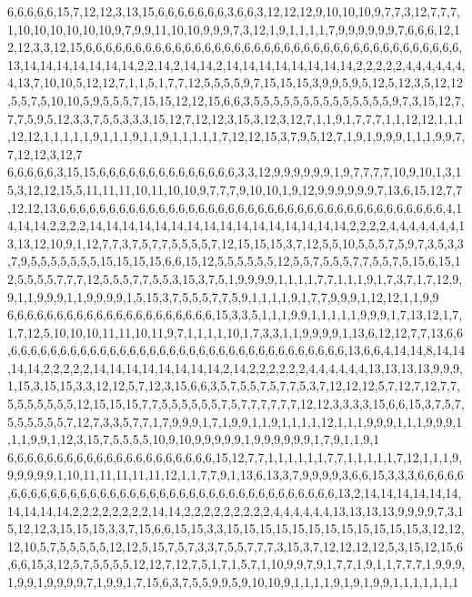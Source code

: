 6,6,6,6,6,15,7,12,12,3,13,15,6,6,6,6,6,6,6,3,6,6,3,12,12,12,9,10,10,10,9,7,7,3,12,7,7,7,1,10,10,10,10,10,10,9,7,9,9,11,10,10,9,9,9,7,3,12,1,9,1,1,1,1,7,9,9,9,9,9,9,7,6,6,6,12,12,12,3,3,12,15,6,6,6,6,6,6,6,6,6,6,6,6,6,6,6,6,6,6,6,6,6,6,6,6,6,6,6,6,6,6,6,6,6,6,6,6,6,6,13,14,14,14,14,14,14,14,2,2,14,2,14,14,2,14,14,14,14,14,14,14,14,2,2,2,2,2,4,4,4,4,4,4,4,13,7,10,10,5,12,12,7,1,1,5,1,7,7,12,5,5,5,5,9,7,15,15,15,3,9,9,5,9,5,12,5,12,3,5,12,12,5,5,7,5,10,10,5,9,5,5,5,7,15,15,12,12,15,6,6,3,5,5,5,5,5,5,5,5,5,5,5,5,5,5,9,7,3,15,12,7,7,7,5,9,5,12,3,3,7,5,5,3,3,3,15,12,7,12,12,3,15,3,12,3,12,7,1,1,9,1,7,7,7,1,1,12,12,1,1,1,12,12,1,1,1,1,1,9,1,1,1,9,1,1,9,1,1,1,1,1,7,12,12,15,3,7,9,5,12,7,1,9,1,9,9,9,1,1,1,9,9,7,7,12,12,3,12,7
6,6,6,6,6,3,15,15,6,6,6,6,6,6,6,6,6,6,6,6,6,6,3,3,12,9,9,9,9,9,9,1,9,7,7,7,7,10,9,10,1,3,15,3,12,12,15,5,11,11,11,10,11,10,10,9,7,7,7,9,10,10,1,9,12,9,9,9,9,9,9,7,13,6,15,12,7,7,12,12,13,6,6,6,6,6,6,6,6,6,6,6,6,6,6,6,6,6,6,6,6,6,6,6,6,6,6,6,6,6,6,6,6,6,6,6,6,6,6,6,4,14,14,14,2,2,2,2,14,14,14,14,14,14,14,14,14,14,14,14,14,14,14,14,2,2,2,2,4,4,4,4,4,4,4,13,13,12,10,9,1,12,7,7,3,7,5,7,7,5,5,5,5,7,12,15,15,15,3,7,12,5,5,10,5,5,5,7,5,9,7,3,5,3,3,7,9,5,5,5,5,5,5,5,15,15,15,15,6,6,15,12,5,5,5,5,5,5,12,5,5,7,5,5,5,7,7,5,5,7,5,15,6,15,12,5,5,5,5,7,7,7,12,5,5,5,7,7,5,5,3,15,3,7,5,1,9,9,9,9,1,1,1,1,7,7,1,1,1,9,1,7,3,7,1,7,12,9,9,1,1,9,9,9,1,1,9,9,9,9,1,5,15,3,7,5,5,5,7,7,5,9,1,1,1,1,9,1,7,7,9,9,9,1,12,12,1,1,9,9
6,6,6,6,6,6,6,6,6,6,6,6,6,6,6,6,6,6,6,6,6,15,3,3,5,1,1,1,9,9,1,1,1,1,1,9,9,9,1,7,13,12,1,7,1,7,12,5,10,10,10,11,11,10,11,9,7,1,1,1,1,10,1,7,3,3,1,1,9,9,9,9,1,13,6,12,12,7,7,13,6,6,6,6,6,6,6,6,6,6,6,6,6,6,6,6,6,6,6,6,6,6,6,6,6,6,6,6,6,6,6,6,6,6,6,6,13,6,6,4,14,14,8,14,14,14,14,2,2,2,2,2,14,14,14,14,14,14,14,14,2,14,2,2,2,2,2,2,4,4,4,4,4,4,13,13,13,13,9,9,9,1,15,3,15,15,3,3,12,12,5,7,12,3,15,6,6,3,5,7,5,5,7,5,7,7,5,3,7,12,12,12,5,7,12,7,12,7,7,5,5,5,5,5,5,5,12,15,15,15,7,7,5,5,5,5,5,5,7,5,7,7,7,7,7,7,12,12,3,3,3,3,15,6,6,15,3,7,5,7,5,5,5,5,5,5,7,12,7,3,3,5,7,7,1,7,9,9,9,1,7,1,9,9,1,1,9,1,1,1,1,12,1,1,1,9,9,9,1,1,1,9,9,9,1,1,1,9,9,1,12,3,15,7,5,5,5,5,10,9,10,9,9,9,9,9,1,9,9,9,9,9,9,1,7,9,1,1,9,1
6,6,6,6,6,6,6,6,6,6,6,6,6,6,6,6,6,6,6,6,6,15,12,7,7,1,1,1,1,1,1,7,7,1,1,1,1,1,7,12,1,1,1,9,9,9,9,9,9,1,10,11,11,11,11,11,12,1,1,7,7,9,1,13,6,13,3,7,9,9,9,9,3,6,6,15,3,3,3,6,6,6,6,6,6,6,6,6,6,6,6,6,6,6,6,6,6,6,6,6,6,6,6,6,6,6,6,6,6,6,6,6,6,6,6,6,6,13,2,14,14,14,14,14,14,14,14,14,14,2,2,2,2,2,2,2,2,14,14,2,2,2,2,2,2,2,2,2,4,4,4,4,4,4,13,13,13,13,9,9,9,9,7,3,15,12,12,3,15,15,15,3,3,7,15,6,6,15,15,3,3,15,15,15,15,15,15,15,15,15,15,15,15,3,12,12,12,10,5,7,5,5,5,5,5,12,12,5,15,7,5,7,3,3,7,5,5,7,7,7,3,15,3,7,12,12,12,12,5,3,15,12,15,6,6,6,15,3,12,5,7,5,5,5,5,12,12,7,12,7,5,1,7,1,5,7,1,10,9,9,7,9,1,7,7,1,9,1,1,7,7,7,1,9,9,9,1,9,9,1,9,9,9,9,7,1,9,9,1,7,15,6,3,7,5,5,9,9,5,9,10,10,9,1,1,1,1,9,1,9,1,9,9,1,1,1,1,1,1,1

